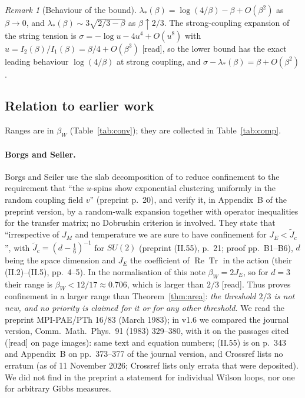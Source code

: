 \documentclass[11pt,a4paper]{article}
\theoremstyle{remark}
\theoremstyle{definition}
\theoremstyle{plain}
\theoremstyle{remark}
\newtheorem{alrem}[althm]{Remark}
\newcommand{\st}[1]{\textsf{[#1]}}
\begin{document}
\begin{alrem}[Behaviour of the bound]\label{rem:al-behaviour}
$\lambda_*(\beta)=\log(4/\beta)-\beta+O(\beta^2)$ as $\beta\to0$, and $\lambda_*(\beta)\sim3\sqrt{2/3-\beta}$ as $\beta\uparrow2/3$. The strong-coupling expansion of the string tension is $\sigma=-\log u-4u^4+O(u^8)$ with $u=I_2(\beta)/I_1(\beta)=\beta/4+O(\beta^3)$ \cite[Table~1]{DZ81} \st{read}, so the lower bound has the exact leading behaviour $\log(4/\beta)$ at strong coupling, and $\sigma-\lambda_*(\beta)=\beta+O(\beta^2)$.
\end{alrem}

\subsection{Relation to earlier work}\label{sec:areaprior}

Ranges are in $\beta_W$ (Table~\ref{tab:conv}); they are collected in Table~\ref{tab:comp}.

\paragraph{Borgs and Seiler.} Borgs and Seiler \cite{BS83} use the slab decomposition of \cite{DF80} to reduce confinement to the requirement that ``the $u$-spins show exponential clustering uniformly in the random coupling field $v$'' (preprint p.~20), and verify it, in Appendix~B of the preprint version, by a random-walk expansion together with operator inequalities for the transfer matrix; no Dobrushin criterion is involved. They state that ``irrespective of $J_M$ and temperature we are sure to have confinement for $J_E<\tilde J_c$'', with $\tilde J_c=(d-\frac16)^{-1}$ for $SU(2)$ (preprint (II.55), p.~21; proof pp.~B1--B6), $d$ being the space dimension and $J_E$ the coefficient of $\operatorname{Re}\operatorname{Tr}$ in the action (their (II.2)--(II.5), pp.~4--5). In the normalisation of this note $\beta_W=2J_E$, so for $d=3$ their range is $\beta_W<12/17\approx0.706$, which is larger than $2/3$ \st{read}. Thus \cite[Appendix~B of the preprint version]{BS83} proves confinement in a larger range than Theorem~\ref{thm:area}: \emph{the threshold $2/3$ is not new, and no priority is claimed for it or for any other threshold.} We read the preprint MPI-PAE/PTh 16/83 (March 1983); in v1.6 we compared the journal version, Comm.\ Math.\ Phys.\ 91 (1983) 329--380, with it on the passages cited (\st{read} on page images): same text and equation numbers; (II.55) is on p.~343 and Appendix~B on pp.~373--377 of the journal version, and Crossref lists no erratum (as of 11 November 2026; Crossref lists only errata that were deposited). We did not find in the preprint a statement for individual Wilson loops, nor one for arbitrary Gibbs measures.
\end{document}
